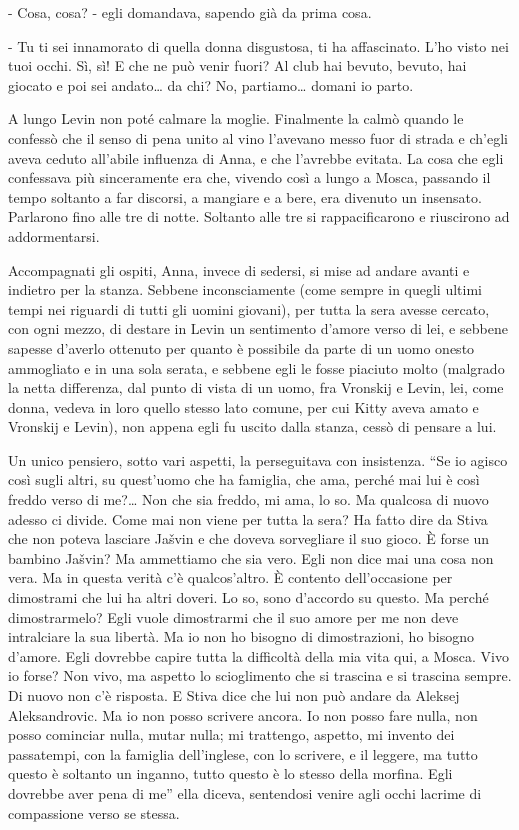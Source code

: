 - Cosa, cosa? - egli domandava, sapendo già da prima cosa. 

- Tu ti sei innamorato di quella donna disgustosa, ti ha affascinato. L'ho visto nei tuoi occhi. Sì, sì! E che ne può venir fuori? Al club hai bevuto, bevuto, hai giocato e poi sei andato\ldots{} da chi? No, partiamo\ldots{} domani io parto. 

A lungo Levin non poté calmare la moglie. Finalmente la calmò quando le confessò che il senso di pena unito al vino l'avevano messo fuor di strada e ch'egli aveva ceduto all'abile influenza di Anna, e che l'avrebbe evitata. La cosa che egli confessava più sinceramente era che, vivendo così a lungo a Mosca, passando il tempo soltanto a far discorsi, a mangiare e a bere, era divenuto un insensato. Parlarono fino alle tre di notte. Soltanto alle tre si rappacificarono e riuscirono ad addormentarsi. 

Accompagnati gli ospiti, Anna, invece di sedersi, si mise ad andare avanti e indietro per la stanza. Sebbene inconsciamente (come sempre in quegli ultimi tempi nei riguardi di tutti gli uomini giovani), per tutta la sera avesse cercato, con ogni mezzo, di destare in Levin un sentimento d'amore verso di lei, e sebbene sapesse d'averlo ottenuto per quanto è possibile da parte di un uomo onesto ammogliato e in una sola serata, e sebbene egli le fosse piaciuto molto (malgrado la netta differenza, dal punto di vista di un uomo, fra Vronskij e Levin, lei, come donna, vedeva in loro quello stesso lato comune, per cui Kitty aveva amato e Vronskij e Levin), non appena egli fu uscito dalla stanza, cessò di pensare a lui. 

Un unico pensiero, sotto vari aspetti, la perseguitava con insistenza. ``Se io agisco così sugli altri, su quest'uomo che ha famiglia, che ama, perché mai lui è così freddo verso di me?\ldots{} Non che sia freddo, mi ama, lo so. Ma qualcosa di nuovo adesso ci divide. Come mai non viene per tutta la sera? Ha fatto dire da Stiva che non poteva lasciare Jašvin e che doveva sorvegliare il suo gioco. È forse un bambino Jašvin? Ma ammettiamo che sia vero. Egli non dice mai una cosa non vera. Ma in questa verità c'è qualcos'altro. È contento dell'occasione per dimostrami che lui ha altri doveri. Lo so, sono d'accordo su questo. Ma perché dimostrarmelo? Egli vuole dimostrarmi che il suo amore per me non deve intralciare la sua libertà. Ma io non ho bisogno di dimostrazioni, ho bisogno d'amore. Egli dovrebbe capire tutta la difficoltà della mia vita qui, a Mosca. Vivo io forse? Non vivo, ma aspetto lo scioglimento che si trascina e si trascina sempre. Di nuovo non c'è risposta. E Stiva dice che lui non può andare da Aleksej Aleksandrovic. Ma io non posso scrivere ancora. Io non posso fare nulla, non posso cominciar nulla, mutar nulla; mi trattengo, aspetto, mi invento dei passatempi, con la famiglia dell'inglese, con lo scrivere, e il leggere, ma tutto questo è soltanto un inganno, tutto questo è lo stesso della morfina. Egli dovrebbe aver pena di me'' ella diceva, sentendosi venire agli occhi lacrime di compassione verso se stessa. 


